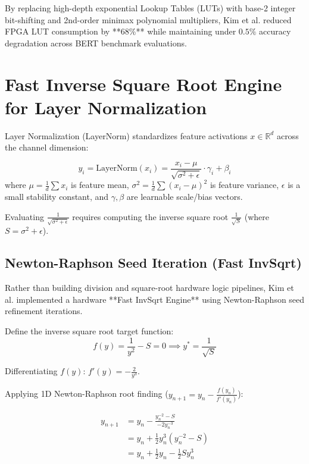 \begin{hardwarebox}
By replacing high-depth exponential Lookup Tables (LUTs) with base-2 integer bit-shifting and 2nd-order minimax polynomial multipliers, Kim et al. reduced FPGA LUT consumption by **$68\%$** while maintaining under $0.5\%$ accuracy degradation across BERT benchmark evaluations.
\end{hardwarebox}


\section{Fast Inverse Square Root Engine for Layer Normalization}
Layer Normalization (LayerNorm) standardizes feature activations $x \in \mathbb{R}^d$ across the channel dimension:

\begin{equation}
y_i = \text{LayerNorm}(x_i) = \frac{x_i - \mu}{\sqrt{\sigma^2 + \epsilon}} \cdot \gamma_i + \beta_i
\end{equation}
where $\mu = \frac{1}{d} \sum x_i$ is feature mean, $\sigma^2 = \frac{1}{d} \sum (x_i - \mu)^2$ is feature variance, $\epsilon$ is a small stability constant, and $\gamma, \beta$ are learnable scale/bias vectors.

Evaluating $\frac{1}{\sqrt{\sigma^2 + \epsilon}}$ requires computing the inverse square root $\frac{1}{\sqrt{S}}$ (where $S = \sigma^2 + \epsilon$).

\subsection{Newton-Raphson Seed Iteration (Fast InvSqrt)}
Rather than building division and square-root hardware logic pipelines, Kim et al. implemented a hardware **Fast InvSqrt Engine** using Newton-Raphson seed refinement iterations.

Define the inverse square root target function:
\begin{equation}
f(y) = \frac{1}{y^2} - S = 0 \implies y^* = \frac{1}{\sqrt{S}}
\end{equation}

Differentiating $f(y)$: $f'(y) = -\frac{2}{y^3}$.

Applying 1D Newton-Raphson root finding ($y_{n+1} = y_n - \frac{f(y_n)}{f'(y_n)}$):

\begin{align}
y_{n+1} &= y_n - \frac{y_n^{-2} - S}{-2 y_n^{-3}} \\
&= y_n + \frac{1}{2} y_n^3 (y_n^{-2} - S) \\
&= y_n + \frac{1}{2} y_n - \frac{1}{2} S y_n^3
\end{align}

